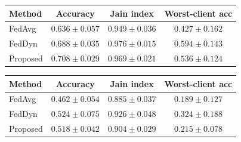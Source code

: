 \begin{tabular}{lccc}
\toprule
Method & Accuracy & Jain index & Worst-client acc \\
\midrule
FedAvg & $0.636\pm0.057$ & $0.949\pm0.036$ & $0.427\pm0.162$ \\
FedDyn & $0.688\pm0.035$ & $0.976\pm0.015$ & $0.594\pm0.143$ \\
Proposed & $0.708\pm0.029$ & $0.969\pm0.021$ & $0.536\pm0.124$ \\
\bottomrule
\end{tabular}

\begin{tabular}{lccc}
\toprule
Method & Accuracy & Jain index & Worst-client acc \\
\midrule
FedAvg & $0.462\pm0.054$ & $0.885\pm0.037$ & $0.189\pm0.127$ \\
FedDyn & $0.524\pm0.075$ & $0.926\pm0.048$ & $0.324\pm0.188$ \\
Proposed & $0.518\pm0.042$ & $0.904\pm0.029$ & $0.215\pm0.078$ \\
\bottomrule
\end{tabular}

